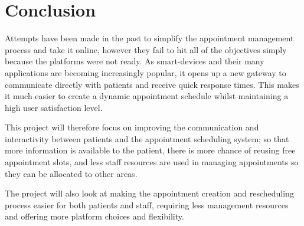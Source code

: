 \section{Conclusion}

Attempts have been made in the past to simplify the appointment management process and take it online, however they fail to hit all of the objectives simply because the platforms were not ready. As smart-devices and their many applications are becoming increasingly popular, it opens up a new gateway to communicate directly with patients and receive quick response times. This makes it much easier to create a dynamic appointment schedule whilst maintaining a high user satisfaction level.

This project will therefore focus on improving the communication and interactivity between patients and the appointment scheduling system; so that more information is available to the patient, there is more chance of reusing free appointment slots, and less staff resources are used in managing appointments so they can be allocated to other areas.

The project will also look at making the appointment creation and rescheduling process easier for both patients and staff, requiring less management resources and offering more platform choices and flexibility.